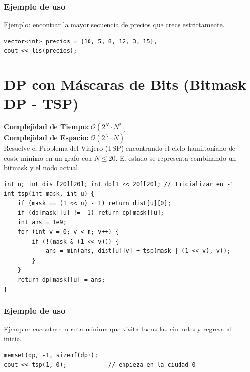 \documentclass[10pt,twocolumn,letterpaper]{report}
\begin{document}
\subsubsection*{Ejemplo de uso}
Ejemplo: encontrar la mayor secuencia de precios que crece estrictamente.
\begin{lstlisting}
vector<int> precios = {10, 5, 8, 12, 3, 15};
cout << lis(precios);
\end{lstlisting}

\section{DP con Máscaras de Bits (Bitmask DP - TSP)}
\textbf{Complejidad de Tiempo:} $\mathcal{O}(2^N \cdot N^2)$ \\
\textbf{Complejidad de Espacio:} $\mathcal{O}(2^N \cdot N)$ \\
Resuelve el Problema del Viajero (TSP) encontrando el ciclo hamiltoniano de coste mínimo en un grafo con $N \le 20$. El estado se representa combinando un bitmask y el nodo actual.
\begin{lstlisting}
int n; int dist[20][20]; int dp[1 << 20][20]; // Inicializar en -1
int tsp(int mask, int u) {
    if (mask == (1 << n) - 1) return dist[u][0];
    if (dp[mask][u] != -1) return dp[mask][u];
    int ans = 1e9;
    for (int v = 0; v < n; v++) {
        if (!(mask & (1 << v))) {
            ans = min(ans, dist[u][v] + tsp(mask | (1 << v), v));
        }
    }
    return dp[mask][u] = ans;
}
\end{lstlisting}
\subsubsection*{Ejemplo de uso}
Ejemplo: encontrar la ruta mínima que visita todas las ciudades y regresa al inicio.
\begin{lstlisting}
memset(dp, -1, sizeof(dp));
cout << tsp(1, 0);            // empieza en la ciudad 0
\end{lstlisting}
\end{document}
